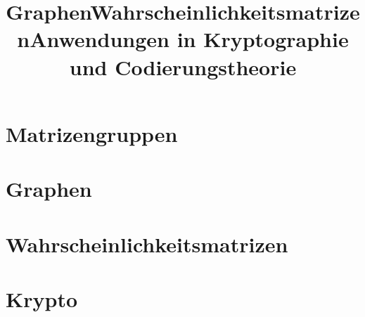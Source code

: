 \section{Matrizengruppen}
\titel


\title[Graphen]{Graphen}
\section{Graphen}
\titel


\title[Wahrscheinlichkeit]{Wahrscheinlichkeitsmatrizen}
\section{Wahrscheinlichkeitsmatrizen}
\titel


\title[Krypto]{Anwendungen in Kryptographie und Codierungstheorie}
\section{Krypto}
\titel


%

